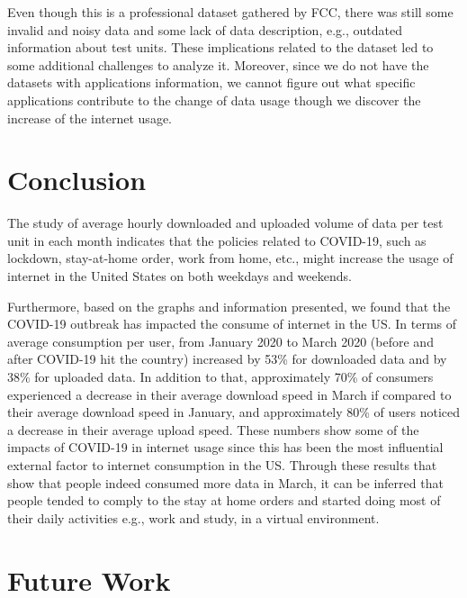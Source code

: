 \documentclass[conference,10pt]{IEEEtran}
\begin{document}
Even though this is a professional dataset gathered by FCC, there was still some invalid and noisy data and some lack of data description, e.g., outdated information about test units. These implications related to the dataset led to some additional challenges to analyze it. Moreover, since we do not have the datasets with applications information, we cannot figure out what specific applications contribute to the change of data usage though we discover the increase of the internet usage.

\section{Conclusion}
\label{sec:conclusion}

The study of average hourly downloaded and uploaded volume of data per test unit in each month indicates that the policies related to COVID-19, such as lockdown, stay-at-home order, work from home, etc., might increase the usage of internet in the United States on both weekdays and weekends.

Furthermore, based on the graphs and information presented, we found that the COVID-19 outbreak has impacted the consume of internet in the US. In terms of average consumption per user, from January 2020 to March 2020 (before and after COVID-19 hit the country) increased by 53\% for downloaded data and by 38\% for uploaded data. In addition to that, approximately 70\% of consumers experienced a decrease in their average download speed in March if compared to their average download speed in January, and approximately 80\% of users noticed a decrease in their average upload speed. These numbers show some of the impacts of COVID-19 in internet usage since this has been the most influential external factor to internet consumption in the US. Through these results that show that people indeed consumed more data in March, it can be inferred that people tended to comply to the stay at home orders and started doing most of their daily activities e.g., work and study, in a virtual environment.

\section{Future Work}
\label{sec:future-work}

\end{document}
